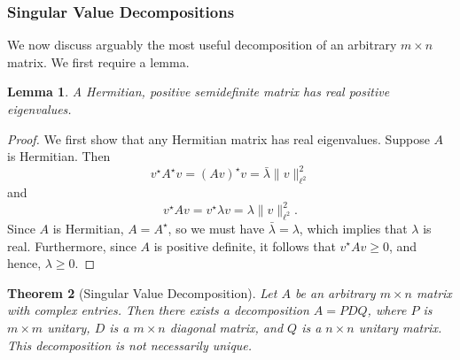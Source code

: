 \documentclass[12pt]{article}
\theoremstyle{plain}
\newtheorem{theorem}{Theorem}
\newtheorem{lemma}[theorem]{Lemma}
\theoremstyle{definition}
\theoremstyle{remark}
\numberwithin{equation}{section}  %
\begin{document}
\subsubsection*{Singular Value Decompositions}
We now discuss arguably the most useful decomposition of an arbitrary $m \times
n$ matrix. We first require a lemma.
\begin{lemma}
\label{lem:hermite}
A Hermitian, positive semidefinite matrix has real positive eigenvalues.
\end{lemma}
\begin{proof}
We first show that any Hermitian matrix has real eigenvalues. Suppose $A$ is Hermitian.
Then
\begin{equation*}
v^{\star} A^{\star} v = (A v)^{\star} v = \bar{\lambda} \| v \|_{\ell^2}^{2}
\end{equation*}
and
\begin{equation*}
 v^{\star} A v = v^{\star} \lambda v =  \lambda \| v \|_{\ell^2}^{2}.
 \end{equation*}
 Since $A$ is Hermitian, $A = A^{\star}$, so we must have $\bar{\lambda} =
\lambda$, which implies that $\lambda$ is real. Furthermore, since $A$ is
positive definite, it follows that $v^\star A v \ge 0$, and hence,
$\lambda \ge 0$.
\end{proof}
\begin{theorem}[Singular Value Decomposition]
Let $A$ be an arbitrary $m \times n$ matrix with complex entries.
Then there exists a decomposition $A = PDQ$, where $P$ is $m \times m$ unitary,
$D$ is a $m \times n$ diagonal matrix, and $Q$ is a $n \times n$ unitary matrix.
This decomposition is not necessarily unique.
\end{theorem} 
\end{document}
